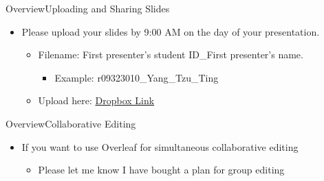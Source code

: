 \documentclass[hyperref={pdfpagelabels=false}]{beamer}
\begin{document}
\begin{frame}{Overview}{Uploading and Sharing Slides}
	\begin{itemize}
		\item Please upload your slides by 9:00 AM on the day of your presentation.
											\vspace{0.2cm}
		\begin{itemize}
			\item Filename: First presenter's student ID\_First presenter's name.
												\vspace{0.2cm}
			\begin{itemize}
				\item Example: r09323010\_Yang\_Tzu\_Ting
													\vspace{0.2cm}
			\end{itemize}
			\item Upload here: \href{https://www.dropbox.com/request/1qkUrEkv02ygFaIJcrrX}{Dropbox Link}
		\end{itemize}
														\vspace{0.2cm}
	
	\end{itemize}
\end{frame}



\begin{frame}{Overview}{Collaborative Editing}
	\begin{itemize}
		
		\item If you want to use Overleaf for simultaneous collaborative editing
		
		\begin{itemize}
			\vspace{0.2cm}
			\item Please let me know I have bought a plan for group editing
		\end{itemize}
	\end{itemize}
\end{frame}
\end{document}
